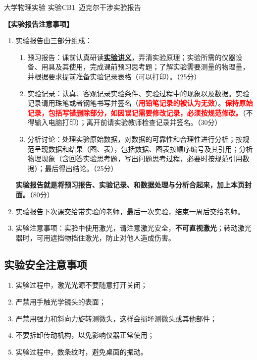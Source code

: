 \documentclass[dvipsnames, svgnames,a4paper,11pt]{article}
\begin{document}

\infoTable{\rule{2.5cm}{0.4pt}}{\rule{2.5cm}{0.4pt}}{\rule{2.5cm}{0.4pt}}{\rule{3cm}{0.4pt}}{\rule{3cm}{0.4pt}}{\rule{3cm}{0.4pt}}

\begin{center}
	\LARGE 大学物理实验 \quad 实验CB1\ 迈克尔干涉实验报告
\end{center}

\textbf{【实验报告注意事项】}
\begin{enumerate}
	\item 实验报告由三部分组成：
	\begin{enumerate}
		\item 预习报告：课前认真研读\underline{\textbf{实验讲义}}，弄清实验原理；实验所需的仪器设备、用具及其使用，完成课前预习思考题；了解实验需要测量的物理量，并根据要求提前准备实验记录表格（可以打印）。（25分）
	    \item 实验记录：认真、客观记录实验条件、实验过程中的现象以及数据。实验记录请用珠笔或者钢笔书写并签名（\textcolor{red}{\textbf{用铅笔记录的被认为无效}}）。\textcolor{red}{\textbf{保持原始记录，包括写错删除部分，如因误记需要修改记录，必须按规范修改。}}（不得输入电脑打印）；离开前请实验教师检查记录并签名。（30分）
	    \item 分析讨论：处理实验原始数据，对数据的可靠性和合理性进行分析；按规范呈现数据和结果（图、表），包括数据、图表按顺序编号及其引用；分析物理现象（含回答实验思考题，写出问题思考过程，必要时按规范引用数据）；最后得出结论。（25分）
	\end{enumerate}
	\textbf{实验报告就是将预习报告、实验记录、和数据处理与分析合起来，加上本页封面。}（80分）
	\item 实验报告下次课交给带实验的老师，最后一次实验，结束一周后交给老师。
	\item 实验注意事项：实验中使用激光，请注意激光安全，\textbf{不可直视激光}；转动激光器时，可用遮挡物挡住激光，防止对他人造成伤害。
\end{enumerate}

\subsection{实验安全注意事项}
\begin{enumerate}
	\item 实验过程中，激光光源不要随意打开关闭；
	\item 严禁用手触光学镜头的表面；
	\item 严禁用强力和斜向力旋转测微头，这样会损坏测微头或其他部件；
	\item 不要拆卸传动机构，以免影响仪器正常使用；
	\item 实验过程中，数条纹时，避免桌面的振动。
\end{enumerate}
\end{document}
